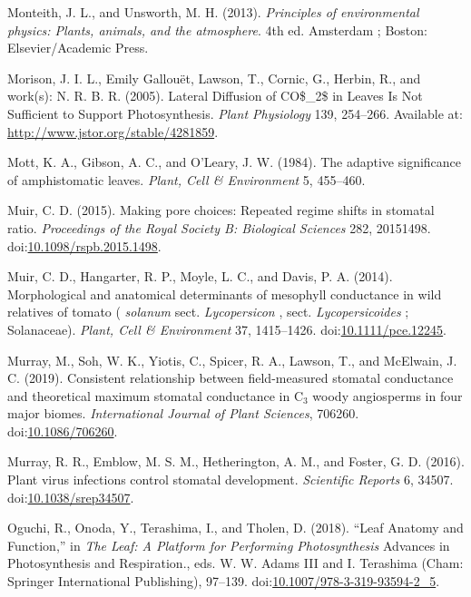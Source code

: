 \documentclass[utf8]{frontiersSCNS}
\begin{document}
\leavevmode\hypertarget{ref-monteith_principles_2013}{}%
Monteith, J. L., and Unsworth, M. H. (2013). \emph{Principles of
environmental physics: Plants, animals, and the atmosphere}. 4th ed.
Amsterdam ; Boston: Elsevier/Academic Press.

\leavevmode\hypertarget{ref-morison_lateral_2005}{}%
Morison, J. I. L., Emily Gallouët, Lawson, T., Cornic, G., Herbin, R.,
and work(s): N. R. B. R. (2005). Lateral Diffusion of CO\$\_2\$ in
Leaves Is Not Sufficient to Support Photosynthesis. \emph{Plant
Physiology} 139, 254--266. Available at:
\url{http://www.jstor.org/stable/4281859}.

\leavevmode\hypertarget{ref-mott_adaptive_1984}{}%
Mott, K. A., Gibson, A. C., and O'Leary, J. W. (1984). The adaptive
significance of amphistomatic leaves. \emph{Plant, Cell \& Environment}
5, 455--460.

\leavevmode\hypertarget{ref-muir_making_2015}{}%
Muir, C. D. (2015). Making pore choices: Repeated regime shifts in
stomatal ratio. \emph{Proceedings of the Royal Society B: Biological
Sciences} 282, 20151498.
doi:\href{https://doi.org/10.1098/rspb.2015.1498}{10.1098/rspb.2015.1498}.

\leavevmode\hypertarget{ref-muir_morphological_2014}{}%
Muir, C. D., Hangarter, R. P., Moyle, L. C., and Davis, P. A. (2014).
Morphological and anatomical determinants of mesophyll conductance in
wild relatives of tomato ( \emph{solanum} sect. \emph{Lycopersicon} ,
sect. \emph{Lycopersicoides} ; Solanaceae). \emph{Plant, Cell \&
Environment} 37, 1415--1426.
doi:\href{https://doi.org/10.1111/pce.12245}{10.1111/pce.12245}.

\leavevmode\hypertarget{ref-murray_consistent_2019}{}%
Murray, M., Soh, W. K., Yiotis, C., Spicer, R. A., Lawson, T., and
McElwain, J. C. (2019). Consistent relationship between field-measured
stomatal conductance and theoretical maximum stomatal conductance in
C\(_{\textrm{3}}\) woody angiosperms in four major biomes.
\emph{International Journal of Plant Sciences}, 706260.
doi:\href{https://doi.org/10.1086/706260}{10.1086/706260}.

\leavevmode\hypertarget{ref-murray_plant_2016}{}%
Murray, R. R., Emblow, M. S. M., Hetherington, A. M., and Foster, G. D.
(2016). Plant virus infections control stomatal development.
\emph{Scientific Reports} 6, 34507.
doi:\href{https://doi.org/10.1038/srep34507}{10.1038/srep34507}.

\leavevmode\hypertarget{ref-oguchi_leaf_2018}{}%
Oguchi, R., Onoda, Y., Terashima, I., and Tholen, D. (2018). ``Leaf
Anatomy and Function,'' in \emph{The Leaf: A Platform for Performing
Photosynthesis} Advances in Photosynthesis and Respiration., eds. W. W.
Adams III and I. Terashima (Cham: Springer International Publishing),
97--139.
doi:\href{https://doi.org/10.1007/978-3-319-93594-2_5}{10.1007/978-3-319-93594-2\_5}.
\end{document}
